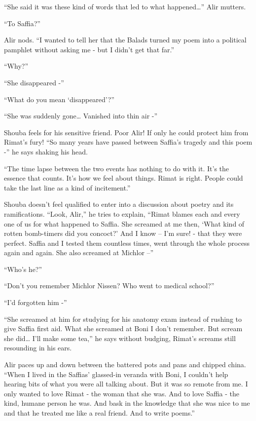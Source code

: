 \documentclass[twoside,11pt]{book}
\begin{document}
``She said it was these kind of words that led to what happened{\dots}'' Alir mutters.

``To Saffia?''

Alir nods. ``I wanted to tell her that the Balads turned my poem into a political pamphlet without asking
me - but I didn't get that far.''

``Why?''

``She disappeared -''

``What do you mean `disappeared'?''

``She was suddenly gone{\dots} Vanished into thin air -''

Shouba feels for his sensitive friend. Poor Alir! If only he could protect him from Rimat's fury! ``So many
years have passed between Saffia's tragedy and this poem -'' he says shaking his head.

``The time lapse between the two events has nothing to do with it. It's the essence that counts. It's how
we feel about things. Rimat is right. People could take the last line as a kind of incitement.''

Shouba doesn't feel qualified to enter into a discussion about poetry and its ramifications.
 ``Look, Alir,'' he tries to explain, ``Rimat blames each and every one of us for what
happened to Saffia. She screamed at me then, `What kind of rotten bomb-timers did you concoct?' And I know -- I'm sure!
- that they were perfect. Saffia and I tested them countless times, went through the whole process again and again.
She also screamed at Michlor --''

``Who's he?''

``Don't you remember Michlor Nissen? Who went to medical school?''

``I'd forgotten him -''

``She screamed at him for studying for his anatomy exam instead of rushing to give Saffia first aid. What
she screamed at Boni I don't remember. But scream she did{\dots} I'll make some tea,'' he says without
budging, Rimat's screams still resounding in his ears.

Alir paces up and down between the battered pots and pans and chipped china. ``When I lived in the Saffias'
glassed-in veranda with Boni, I couldn't help hearing bits of what you were all talking about.  But it was so remote
from me. I only wanted to love Rimat - the woman that she was. And to love Saffia - the kind, humane person he was.
And bask in the knowledge that she was nice to me and that he treated me like a real friend. And to write
poems.''
\end{document}
